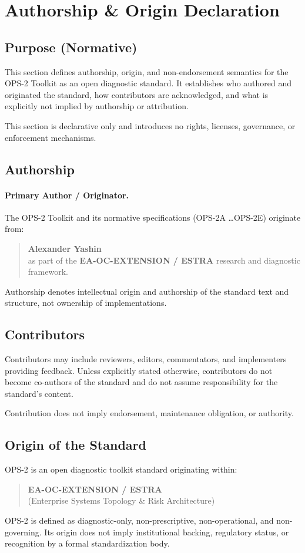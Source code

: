\section{Authorship \& Origin Declaration}

\subsection{Purpose (Normative)}
This section defines authorship, origin, and non-endorsement semantics for the OPS-2 Toolkit as an open diagnostic standard.
It establishes who authored and originated the standard, how contributors are acknowledged, and what is explicitly not implied by authorship or attribution.

This section is declarative only and introduces no rights, licenses, governance, or enforcement mechanisms.

\subsection{Authorship}
\paragraph{Primary Author / Originator.}
The OPS-2 Toolkit and its normative specifications (OPS-2A \ldots OPS-2E) originate from:
\begin{quote}
\textbf{Alexander Yashin}\\
as part of the \textbf{EA-OC-EXTENSION / ESTRA} research and diagnostic framework.
\end{quote}
Authorship denotes intellectual origin and authorship of the standard text and structure, not ownership of implementations.

\subsection{Contributors}
Contributors may include reviewers, editors, commentators, and implementers providing feedback.
Unless explicitly stated otherwise, contributors do not become co-authors of the standard and do not assume responsibility for the standard's content.

Contribution does not imply endorsement, maintenance obligation, or authority.

\subsection{Origin of the Standard}
OPS-2 is an open diagnostic toolkit standard originating within:
\begin{quote}
\textbf{EA-OC-EXTENSION / ESTRA}\\
(Enterprise Systems Topology \& Risk Architecture)
\end{quote}
OPS-2 is defined as diagnostic-only, non-prescriptive, non-operational, and non-governing.
Its origin does not imply institutional backing, regulatory status, or recognition by a formal standardization body.

